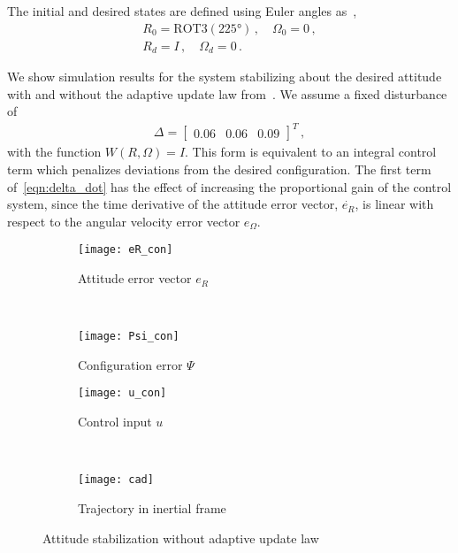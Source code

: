 \documentclass[letterpaper, 10 pt, conference]{ieeeconf}  %
\begin{document}
The initial and desired states are defined using Euler angles as~\cite{shuster1993},
\begin{gather*}
	R_0 = \text{ROT3}(\ang{225}) \, , \quad \Omega_0 = 0 \, ,\\
	R_d = I \, , \quad \Omega_d = 0 \, .
\end{gather*}

We show simulation results for the system stabilizing about the desired attitude with and without the adaptive update law from~.
We assume a fixed disturbance of 
\begin{gather*}
	\Delta = \begin{bmatrix} 0.06 & 0.06 & 0.09 \end{bmatrix}^T \, ,
\end{gather*}
with the function \( W(R,\Omega) = I \).
This form is equivalent to an integral control term which penalizes deviations from the desired configuration.
The first term of~\cref{eqn:delta_dot} has the effect of increasing the proportional gain of the control system, since the time derivative of the attitude error vector, \( \dot{e_{R}} \), is linear with respect to the angular velocity error vector \( e_\Omega\).
\begin{figure} 
	\centering 
	\begin{subfigure}[htbp]{0.5\columnwidth} 
		\texttt{[image: eR\_con]} 
		\caption{Attitude error vector \(e_R\) } \label{fig:eR_con} 
	\end{subfigure}~ %
	\begin{subfigure}[htbp]{0.5\columnwidth} 
		\texttt{[image: Psi\_con]} 
		\caption{Configuration error \( \Psi \)} \label{fig:Psi_con} 
	\end{subfigure}
	
	\begin{subfigure}[htbp]{0.5\columnwidth} 
		\texttt{[image: u\_con]} 
		\caption{Control input \( u\)} \label{fig:u_con} 
	\end{subfigure}~
	\begin{subfigure}[htbp]{0.5\columnwidth}
		\texttt{[image: cad]}
		\caption{Trajectory in inertial frame\label{fig:cad}}
	\end{subfigure}
	\caption{Attitude stabilization without adaptive update law}
	\label{fig:con} 
\end{figure}
\end{document}
